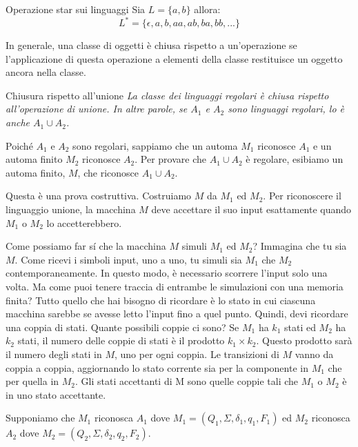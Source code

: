 \begin{Example}{Operazione star sui linguaggi}{}
    Sia $L=\{a, b\}$ allora:
    \begin{equation*}
        L^*=\{\epsilon, a, b, aa, ab, ba, bb, ...\}
    \end{equation*}
\end{Example}

In generale, una classe di oggetti è chiusa rispetto a un'operazione se l'applicazione di questa operazione a elementi della classe restituisce un oggetto ancora nella classe. 

\begin{Thm}{Chiusura rispetto all'unione}{}
    \textit{La classe dei linguaggi regolari è chiusa rispetto all'operazione di unione. In altre parole, se $A_{1}$ e $A_{2}$ sono linguaggi regolari, lo è anche $A_{1}\cup A_{2}$.}

    \begin{osservation}
    Poiché $A_{1}$ e $A_{2}$ sono regolari, sappiamo che un automa $M_{1}$ riconosce $A_{1}$ e un automa finito $M_{2}$ riconosce $A_{2}$. Per provare che $A_{1}\cup A_{2}$ è regolare, esibiamo un automa finito, $M$, che riconosce $A_{1}\cup A_{2}$. 

    Questa è una prova costruttiva. Costruiamo $M$ da $M_{1}$ ed $M_{2}$. Per riconoscere il linguaggio unione, la macchina $M$ deve accettare il suo input esattamente quando $M_{1}$ o $M_{2}$ lo accetterebbero.

    Come possiamo far sí che la macchina $M$ simuli $M_{1}$ ed $M_{2}$? Immagina che tu sia $M$. Come ricevi i simboli input, uno a uno, tu simuli sia $M_{1}$ che $M_{2}$ contemporaneamente. In questo modo, è necessario scorrere l'input solo una volta. Ma come puoi tenere traccia di entrambe le simulazioni con una memoria finita? Tutto quello che hai bisogno di ricordare è lo stato in cui ciascuna macchina sarebbe se avesse letto l'input fino a quel punto. Quindi, devi ricordare una coppia di stati. Quante possibili coppie ci sono? Se $M_{1}$ ha $k_{1}$ stati ed $M_{2}$ ha $k_{2}$ stati, il numero delle coppie di stati è il prodotto $k_{1}\times k_{2}$. Questo prodotto sarà il numero degli stati in $M$, uno per ogni coppia. Le transizioni di $M$ vanno da coppia a coppia, aggiornando lo stato corrente sia per la componente in $M_{1}$ che per quella in $M_{2}$. Gli stati accettanti di M sono quelle coppie tali che $M_1$ o $M_2$ è in uno stato accettante.
    \end{osservation}

    \begin{demonstration}
    Supponiamo che $M_{1}$ riconosca $A_{1}$ dove $M_{1} = (Q_{1}, \Sigma, \delta_{1}, q_{1}, F_{1})$ ed $M_{2}$ riconosca $A_{2}$ dove $M_{2} = (Q_{2}, \Sigma, \delta_{2}, q_{2}, F_{2})$. 


\end{demonstration}
\end{Thm}
